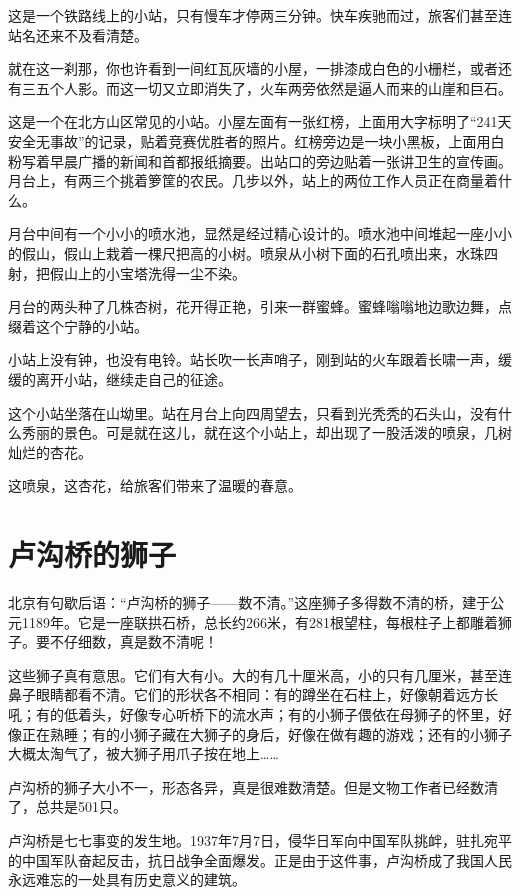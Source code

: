 \documentclass[12pt,UTF-8,openany]{ctexbook}
\begin{document}
\begin{large}
    
    这是一个铁路线上的小站，只有慢车才停两三分钟。快车疾驰而过，旅客们甚至连站名还来不及看清楚。
    
    就在这一刹那，你也许看到一间红瓦灰墙的小屋，一排漆成白色的小栅栏，或者还有三五个人影。而这一切又立即消失了，火车两旁依然是逼人而来的山崖和巨石。
    
    这是一个在北方山区常见的小站。小屋左面有一张红榜，上面用大字标明了“241天安全无事故”的记录，贴着竞赛优胜者的照片。红榜旁边是一块小黑板，上面用白粉写着早晨广播的新闻和首都报纸摘要。出站口的旁边贴着一张讲卫生的宣传画。月台上，有两三个挑着箩筐的农民。几步以外，站上的两位工作人员正在商量着什么。
    
    月台中间有一个小小的喷水池，显然是经过精心设计的。喷水池中间堆起一座小小的假山，假山上栽着一棵尺把高的小树。喷泉从小树下面的石孔喷出来，水珠四射，把假山上的小宝塔洗得一尘不染。
    
    月台的两头种了几株杏树，花开得正艳，引来一群蜜蜂。蜜蜂嗡嗡地边歌边舞，点缀着这个宁静的小站。
    
    小站上没有钟，也没有电铃。站长吹一长声哨子，刚到站的火车跟着长啸一声，缓缓的离开小站，继续走自己的征途。
    
    这个小站坐落在山坳里。站在月台上向四周望去，只看到光秃秃的石头山，没有什么秀丽的景色。可是就在这儿，就在这个小站上，却出现了一股活泼的喷泉，几树灿烂的杏花。
    
    这喷泉，这杏花，给旅客们带来了温暖的春意。
    
\end{large}



\chapter{卢沟桥的狮子}

\begin{large}
    
    北京有句歇后语：“卢沟桥的狮子——数不清。”这座狮子多得数不清的桥，建于公元1189年。它是一座联拱石桥，总长约266米，有281根望柱，每根柱子上都雕着狮子。要不仔细数，真是数不清呢！
    
    这些狮子真有意思。它们有大有小。大的有几十厘米高，小的只有几厘米，甚至连鼻子眼睛都看不清。它们的形状各不相同：有的蹲坐在石柱上，好像朝着远方长吼；有的低着头，好像专心听桥下的流水声；有的小狮子偎依在母狮子的怀里，好像正在熟睡；有的小狮子藏在大狮子的身后，好像在做有趣的游戏；还有的小狮子大概太淘气了，被大狮子用爪子按在地上……
    
    卢沟桥的狮子大小不一，形态各异，真是很难数清楚。但是文物工作者已经数清了，总共是501只。
    
    卢沟桥是七七事变的发生地。1937年7月7日，侵华日军向中国军队挑衅，驻扎宛平的中国军队奋起反击，抗日战争全面爆发。正是由于这件事，卢沟桥成了我国人民永远难忘的一处具有历史意义的建筑。
    
\end{large}
\end{document}
